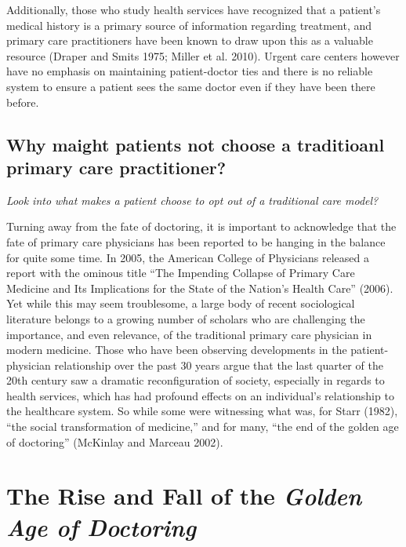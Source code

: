 \documentclass[12pt,twoside]{reedthesis}
\begin{document}
  Additionally, those who study health services have recognized that a
  patient's medical history is a primary source of information regarding
  treatment, and primary care practitioners have been known to draw upon
  this as a valuable resource (Draper and Smits 1975; Miller et al. 2010).
  Urgent care centers however have no emphasis on maintaining
  patient-doctor ties and there is no reliable system to ensure a patient
  sees the same doctor even if they have been there before.
  
  \subsection*{Why maight patients not choose a traditioanl primary care
  practitioner?}\label{why-maight-patients-not-choose-a-traditioanl-primary-care-practitioner}
  
  \emph{Look into what makes a patient choose to opt out of a traditional
  care model?}
  
  Turning away from the fate of doctoring, it is important to acknowledge
  that the fate of primary care physicians has been reported to be hanging
  in the balance for quite some time. In 2005, the American College of
  Physicians released a report with the ominous title ``The Impending
  Collapse of Primary Care Medicine and Its Implications for the State of
  the Nation's Health Care'' (2006). Yet while this may seem troublesome,
  a large body of recent sociological literature belongs to a growing
  number of scholars who are challenging the importance, and even
  relevance, of the traditional primary care physician in modern medicine.
  Those who have been observing developments in the patient-physician
  relationship over the past 30 years argue that the last quarter of the
  20th century saw a dramatic reconfiguration of society, especially in
  regards to health services, which has had profound effects on an
  individual's relationship to the healthcare system. So while some were
  witnessing what was, for Starr (1982), ``the social transformation of
  medicine,'' and for many, ``the end of the golden age of doctoring''
  (McKinlay and Marceau 2002).
  
  \section*{The Rise and Fall of the \emph{Golden Age of
  Doctoring}}\label{the-rise-and-fall-of-the-golden-age-of-doctoring}
  
\end{document}
